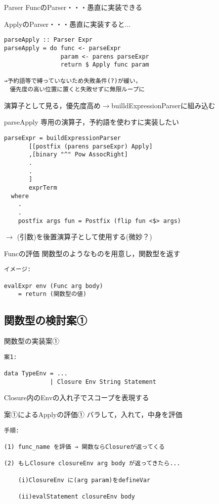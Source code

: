 \documentclass[uplatex,dvipdfmx,ja=standard]{beamer}
\begin{document}
\begin{frame}[fragile]{Parser}
FuncのParser・・・愚直に実装できる

ApplyのParser・・・愚直に実装すると...
    \begin{verbatim}
parseApply :: Parser Expr
parseApply = do func <- parseExpr 
                param <- parens parseExpr 
                return $ Apply func param 

→予約語等で縛っていないため失敗条件(?)が緩い，
　優先度の高い位置に置くと失敗せずに無限ループに
    \end{verbatim}
演算子として見る，優先度高め$\to$builldExpressionParserに組み込む
\end{frame}

\begin{frame}[fragile]{parseApply}
専用の演算子，予約語を使わすに実装したい
    \begin{verbatim}
parseExpr = buildExpressionParser
       [[postfix (parens parseExpr) Apply]
       ,[binary "^" Pow AssocRight]
       .
       .
       ]
       exprTerm 
  where
    .
    .
    postfix args fun = Postfix (flip fun <$> args)
    \end{verbatim}

$\to$ (引数)を後置演算子として使用する(微妙？)

\end{frame}

\begin{frame}[fragile]{Funcの評価}
    関数型のようなものを用意し，関数型を返す
    \begin{verbatim}
イメージ:

evalExpr env (Func arg body) 
    = return (関数型の値)
    \end{verbatim}
\end{frame}

\subsection{関数型の検討案①}

\begin{frame}[fragile]{関数型の実装案①}
    \begin{verbatim}
案1:

data TypeEnv = ... 
             | Closure Env String Statement
    \end{verbatim}
Closure内のEnvの入れ子でスコープを表現する
\end{frame}

\begin{frame}[fragile]{案①によるApplyの評価①}
バラして，入れて，中身を評価
    \begin{verbatim}
手順:

(1) func_name を評価 → 関数ならClosureが返ってくる

(2) もしClosure closureEnv arg body が返ってきたら...

    (i)ClosureEnv に(arg param)をdefineVar

    (ii)evalStatement closureEnv body
    \end{verbatim}
\end{frame}
\end{document}
